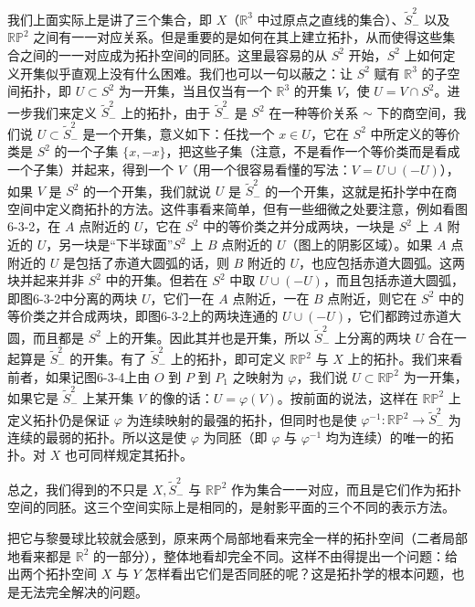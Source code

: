 我们上面实际上是讲了三个集合，即 $X$（$\mathbb R^3$ 中过原点之直线的集合）、$\widetilde S_-^2$ 以及 $\mathbb{RP}^2$ 之间有一一对应关系。但是重要的是如何在其上建立拓扑，从而使得这些集合之间的一一对应成为拓扑空间的同胚。这里最容易的从 $S^2$ 开始，$S^2$ 上如何定义开集似乎直观上没有什么困难。我们也可以一句以蔽之：让 $S^2$ 赋有 $\mathbb R^3$ 的子空间拓扑，即 $U\subset S^2$ 为一开集，当且仅当有一个 $\mathbb R^3$ 的开集 $V$，使 $U=V\cap S^2$。进一步我们来定义 $\widetilde S_-^2$ 上的拓扑，由于 $\widetilde S_-^2$ 是 $S^2$ 在一种等价关系 $\sim$ 下的商空间，我们说 $U\subset\widetilde S_-^2$ 是一个开集，意义如下：任找一个 $x\in U$，它在 $S^2$ 中所定义的等价类是 $S^2$ 的一个子集 $\{x,-x\}$，把这些子集（注意，不是看作一个等价类而是看成一个子集）并起来，得到一个 $V$（用一个很容易看懂的写法：$V=U\cup(-U)$），如果 $V$ 是 $S^2$ 的一个开集，我们就说 $U$ 是 $\widetilde S_-^2$ 的一个开集，这就是拓扑学中在商空间中定义商拓扑的方法。这件事看来简单，但有一些细微之处要注意，例如看图6-3-2，在 $A$ 点附近的 $U$，它在 $S^2$ 中的等价类之并分成两块，一块是 $S^2$ 上 $A$ 附近的 $U$，另一块是“下半球面”$S^2$ 上 $B$ 点附近的 $U$（图上的阴影区域）。如果 $A$ 点附近的 $U$ 是包括了赤道大圆弧的话，则 $B$ 附近的 $U$，也应包括赤道大圆弧。这两块并起来并非 $S^2$ 中的开集。但若在 $S^2$ 中取 $U\cup(-U)$，而且包括赤道大圆弧，即图6-3-2中分离的两块 $U$，它们一在 $A$ 点附近，一在 $B$ 点附近，则它在 $S^2$ 中的等价类之并合成两块，即图6-3-2上的两块连通的 $U\cup(-U)$，它们都跨过赤道大圆，而且都是 $S^2$ 上的开集。因此其并也是开集，所以 $\widetilde S_-^2$ 上分离的两块 $U$ 合在一起算是 $\widetilde S_-^2$ 的开集。有了 $\widetilde S_-^2$ 上的拓扑，即可定义 $\mathbb{RP}^2$ 与 $X$ 上的拓扑。我们来看前者，如果记图6-3-4上由 $O$ 到 $P$ 到 $P_1$ 之映射为 $\varphi$，我们说 $U\subset\mathbb{RP}^2$ 为一开集，如果它是 $\widetilde S_-^2$ 上某开集 $V$ 的像的话：$U=\varphi(V)$。按前面的说法，这样在 $\mathbb{RP}^2$ 上定义拓扑仍是保证 $\varphi$ 为连续映射的最强的拓扑，但同时也是使 $\varphi^{-1}:\mathbb{RP}^2\to\widetilde S_-^2$ 为连续的最弱的拓扑。所以这是使 $\varphi$ 为同胚（即 $\varphi$ 与 $\varphi^{-1}$ 均为连续）的唯一的拓扑。对 $X$ 也可同样规定其拓扑。

总之，我们得到的不只是 $X,\widetilde S_-^2$ 与 $\mathbb{RP}^2$ 作为集合一一对应，而且是它们作为拓扑空间的同胚。这三个空间实际上是相同的，是射影平面的三个不同的表示方法。

把它与黎曼球比较就会感到，原来两个局部地看来完全一样的拓扑空间（二者局部地看来都是 $\mathbb R^2$ 的一部分），整体地看却完全不同。这样不由得提出一个问题：给出两个拓扑空间 $X$ 与 $Y$ 怎样看出它们是否同胚的呢？这是拓扑学的根本问题，也是无法完全解决的问题。

